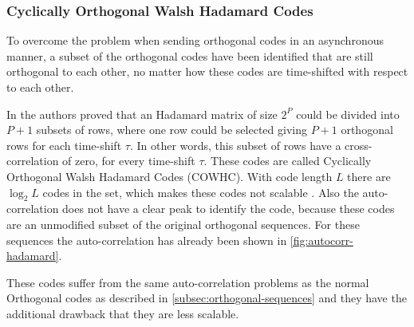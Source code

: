 \subsubsection{Cyclically Orthogonal Walsh Hadamard Codes}

To overcome the problem when sending orthogonal codes in an asynchronous manner, a subset of the orthogonal codes have been identified that are still orthogonal to each other, no matter how these codes are time-shifted with respect to each other.

In \cite{1182447} the authors proved that an Hadamard matrix of size $2^P$ could be divided into $P + 1$ subsets of rows, where one row could be selected giving $P + 1$ orthogonal rows for each time-shift $\tau$.
In other words, this subset of rows have a cross-correlation of zero, for every time-shift $\tau$.
These codes are called Cyclically Orthogonal Walsh Hadamard Codes (COWHC).
With code length $L$ there are $\log_2 L$ codes in the set, which makes these codes not scalable \cite{1182447}. 
Also the auto-correlation does not have a clear peak to identify the code, because these codes are an unmodified subset of the original orthogonal sequences.
For these sequences the auto-correlation has already been shown in \autoref{fig:autocorr-hadamard}.

These codes suffer from the same auto-correlation problems as the normal Orthogonal codes as described in \autoref{subsec:orthogonal-sequences} and they have the additional drawback that they are less scalable.